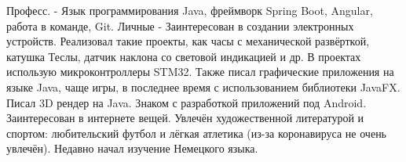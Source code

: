\documentclass[]{cv-style}          %
\begin{document}
\begin{entrylist}
\entry
{Професс.}
{- {\normalfont
Язык программирования Java, фреймворк Spring Boot, Angular, работа в команде, Git. }}
{}
{}
\entry
{Личные}
{- {\normalfont 
Заинтересован в создании электронных устройств. Реализовал такие проекты, как часы с механической развёрткой, катушка Теслы, датчик наклона со световой индикацией и др. В проектах использую микроконтроллеры STM32. Также писал графические приложения на языке Java, чаще игры, в последнее время с использованием библиотеки JavaFX. Писал 3D рендер на Java. Знаком с разработкой приложений под Android. Заинтересован в интернете вещей. Увлечён художественной литературой и спортом: любительский футбол и лёгкая атлетика (из-за коронавируса не очень увлечён). Недавно начал изучение Немецкого языка.}}
{}
{}
\end{entrylist}
\end{document}
